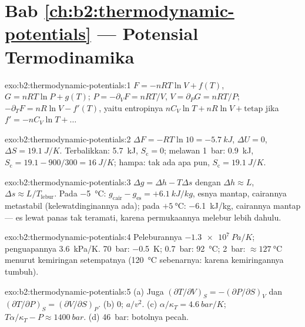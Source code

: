 \section*{Bab \ref{ch:b2:thermodynamic-potentials} --- Potensial Termodinamika}

\begin{solution}{exo:b2:thermodynamic-potentials:1}
$F = -nRT\ln V + f(T)$, $G = nRT\ln P + g(T)$; $P = -\partial_VF = nRT/V$,
$V = \partial_PG = nRT/P$; $-\partial_TF = nR\ln V - f'(T)$, yaitu entropinya
$nC_V\ln T + nR\ln V + \text{tetap}$ jika $f' = -nC_V\ln T + \dots$
\end{solution}

\begin{solution}{exo:b2:thermodynamic-potentials:2}
$\Delta F = -RT\ln 10 = \qty{-5.7}{kJ}$, $\Delta U = 0$, $\Delta S = \qty{19.1}{J/K}$.
Terbalikkan: \qty{5.7}{kJ}, $S_{\text{c}} = 0$; melawan \qty{1}{bar}: \qty{0.9}{kJ},
$S_{\text{c}} = 19.1 - 900/300 = \qty{16}{J/K}$; hampa: tak ada apa pun, $S_{\text{c}} =
\qty{19.1}{J/K}$.
\end{solution}

\begin{solution}{exo:b2:thermodynamic-potentials:3}
$\Delta g = \Delta h - T\Delta s$ dengan $\Delta h \approx L$, $\Delta s \approx L/T_{\text{lebur}}$.
Pada \qty{-5}{\celsius}: $g_{\text{cair}} - g_{\text{es}} = +\qty{6.1}{kJ/kg}$, esnya
mantap, cairannya metastabil (kelewatdinginannya ada); pada $+\qty{5}{\celsius}$:
\qty{-6.1}{kJ/kg}, cairannya mantap --- es lewat panas tak teramati, karena
permukaannya melebur lebih dahulu.
\end{solution}

\begin{solution}{exo:b2:thermodynamic-potentials:4}
Peleburannya $\qty{-1.3e7}{Pa/K}$; penguapannya \qty{3.6}{kPa/K}. \qty{70}{bar}:
\qty{-0.5}{K}; \qty{0.7}{bar}: \qty{92}{\celsius}; \qty{2}{bar}: $\approx
\qty{127}{\celsius}$ menurut kemiringan setempatnya (\qty{120}{\celsius} sebenarnya: karena
kemiringannya tumbuh).
\end{solution}

\begin{solution}{exo:b2:thermodynamic-potentials:5}
(a) Juga $(\partial T/\partial V)_S = -(\partial P/\partial S)_V$ dan
$(\partial T/\partial P)_S = (\partial V/\partial S)_P$. (b) $0$; $a/v^2$. (c)
$\alpha/\kappa_T = \qty{4.6}{bar/K}$; $T\alpha/\kappa_T - P \approx \qty{1400}{bar}$.
(d) \qty{46}{bar}: botolnya pecah.
\end{solution}

